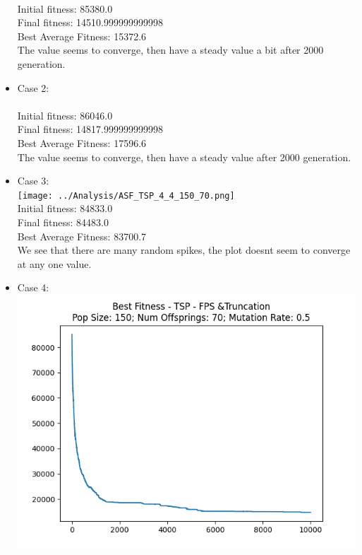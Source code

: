 \documentclass[12pt]{report} %
\begin{document}
\begin{itemize}
	      \\Initial fitness:  85380.0
	      \\Final fitness:  14510.999999999998
	      \\Best Average Fitness: 15372.6
	      \\The value seems to converge, then have a steady value a bit after 2000 generation.
	\item Case 2:\\
	      \\Initial fitness:  86046.0
	      \\Final fitness:  14817.999999999998
	      \\Best Average Fitness: 17596.6
	      \\The value seems to converge, then have a steady value after 2000 generation.
	\item Case 3:\\
	      \texttt{[image: ../Analysis/ASF\_TSP\_4\_4\_150\_70.png]}
	      \\Initial fitness:  84833.0
	      \\Final fitness:  84483.0
	      \\Best Average Fitness: 83700.7
	      \\We see that there are many random spikes, the plot doesnt seem to converge at any one value.
	\item Case 4:\\
	      \includegraphics[scale=0.5]{../Analysis/BSF_TSP_0_3_150_70.png}

\end{itemize}
\end{document}
